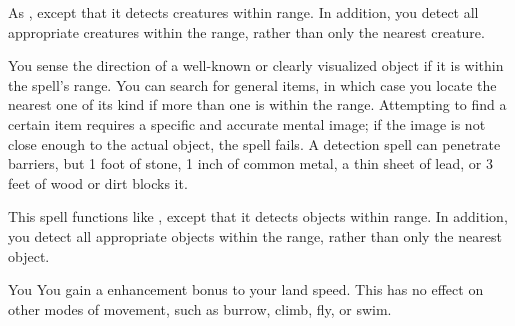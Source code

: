 \spellrng{\rngext}
\spelldur{\durmed \dismissable}
\spelleffect As , except that it detects creatures within \rngext range. In addition, you detect all appropriate creatures within the range, rather than only the nearest creature.

\spellrng{\rnglong}
\spelldur{\durmed \dismissable}
\spelleffect You sense the direction of a well-known or clearly visualized object if it is within the spell's range. You can search for general items, in which case you locate the nearest one of its kind if more than one is within the range. Attempting to find a certain item requires a specific and accurate mental image; if the image is not close enough to the actual object, the spell fails.
\spellnotes A detection spell can penetrate barriers, but 1 foot of stone, 1 inch of common metal, a thin sheet of lead, or 3 feet of wood or dirt blocks it.

\spellrng{\rngext}
\spelldur{\durmed \dismissable}
\spelleffect This spell functions like , except that it detects objects within \rngext range. In addition, you detect all appropriate objects within the range, rather than only the nearest object. 

\spelldur{\durlong \dismissable}
\begin{spelltarget}{You}
    \spelleffect You gain a  enhancement bonus to your land speed. This has no effect on other modes of movement, such as burrow, climb, fly, or swim.
\end{spelltarget}

\begin{comment}
\subsubsection{M}
\end{comment}

